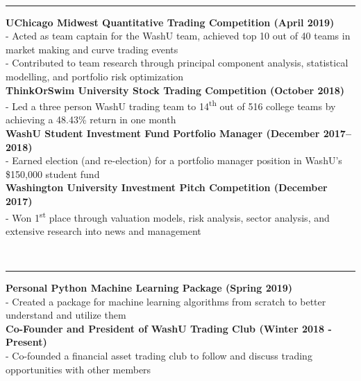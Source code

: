 \documentclass[11pt]{article}
\begin{document}
\begin{titlepage}
\begin{addmargin}[1em]{0em}
		\end{addmargin}
		\vspace{-10pt}
		\noindent
		\\\rule{\textwidth}{0.4pt}
		\begin{addmargin}[1em]{0em}
			\textbf{UChicago Midwest Quantitative Trading Competition \hfill (April 2019)}\\
- Acted as team captain for the WashU team, achieved top 10 out of 40 teams in market making and curve trading events\\
- Contributed to team research through principal component analysis, statistical modelling, and portfolio risk optimization\\
			\textbf{ThinkOrSwim University Stock Trading Competition \hfill (October 2018)}\\
- Led a three person WashU trading team to 14\textsuperscript{th} out of 516 college teams by achieving a 48.43\% return in one month\\
            \textbf{WashU Student Investment Fund Portfolio Manager \hfill (December 2017–2018)}\\
- Earned election (and re-election) for a portfolio manager position in WashU's \$150,000 student fund\\
			\textbf{Washington University Investment Pitch Competition \hfill (December 2017)}\\
- Won 1\textsuperscript{st} place through valuation models, risk analysis, sector analysis, and extensive research into news and management\\
		\end{addmargin}
		\vspace{-10pt}
		\noindent
		\\\rule{\textwidth}{0.4pt}
		\begin{addmargin}[1em]{0em}
			\textbf{Personal Python Machine Learning Package \hfill (Spring 2019)}\\
- Created a package for machine learning algorithms from scratch to better understand and utilize them\\
			\textbf{Co-Founder and President of WashU Trading Club \hfill (Winter 2018 - Present)}\\
- Co-founded a financial asset trading club to follow and discuss trading opportunities with other members\\

\end{addmargin}
\end{titlepage}
\end{document}
